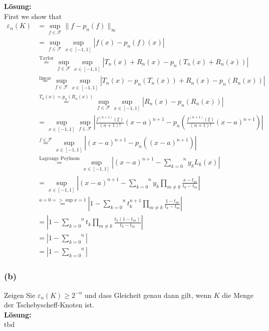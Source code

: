 \documentclass[11pt,a4paper,ngerman]{article}
\begin{document}
\textbf{Lösung:}\\
First we show that
\begin{equation*}\begin{split}
    \varepsilon_n(K)
    &= \underset{f \in \mathcal{F}}{\sup} \| f - p_n(f) \|_\infty\\
    &= \underset{f \in \mathcal{F}}{\sup}
        \underset{x \in [-1,1]}{\sup} | f (x) - p_n(f)(x) |\\
    &\stackrel{\text{Taylor}}{=} \underset{f \in \mathcal{F}}{\sup}
        \underset{x \in [-1,1]}{\sup} | T_n(x) + R_n(x) - p_n(T_n(x) + R_n(x)) |\\
    &\stackrel{\text{linear}}{=}\underset{f \in \mathcal{F}}{\sup} \underset{x \in [-1,1]}{\sup} | T_n(x) - p_n(T_n(x)) + R_n(x) - p_n(R_n(x)) |\\
    &\stackrel{T_n(x)=p_n(R_n(x))}{=} \underset{f \in \mathcal{F}}{\sup}\underset{x \in [-1,1]}{\sup} | R_n(x) - p_n(R_n(x)) | \\
    &= \underset{x \in [-1,1]}{\sup} \underset{f \in \mathcal{F}}{\sup}| \frac{f^{(n+1)}(\xi)}{(n+1)!} (x-a)^{n+1} - p_n(\frac{f^{(n+1)}(\xi)}{(n+1)!} (x-a)^{n+1}) |\\
    &\stackrel{f \in \mathcal{F}}{=} \underset{x \in [-1,1]}{\sup} | (x-a)^{n+1} - p_n((x-a)^{n+1}) |\\
    &\stackrel{\text{Lagrange Poylnom}}{=}
        \underset{x \in [-1,1]}{\sup}
    \left| (x-a)^{n+1} - \overset{n}{\underset{k=0}{\sum}} y_k L_k(x) \right|\\     
    &= \underset{x \in [-1,1]}{\sup}
     \left| (x-a)^{n+1} - 
    \overset{n}{\underset{k=0}{\sum}} y_k \underset{m \not= k}{\prod}
    \frac{x - t_m}{t_k - t_m} \right|\\
    &\stackrel{a = 0 => \sup x=1}{=}
        \left| 1 - \overset{n}{\underset{k=0}{\sum}} t_k^{n+1}
        \underset{m \not= k}{\prod} \frac{1 - t_m}{t_k - t_m} \right| \\
    &= \left| 1 - \overset{n}{\underset{k=0}{\sum}} t_k
        \underset{m \not= k}{\prod} \frac{t_k(1-t_m)}{t_k - t_m} \right| \\
    &= \left| 1 - \overset{n}{\underset{k=0}{\sum}} 
         \right|\\
    &= \left| 1 - \overset{n}{\underset{k=0}{\sum}}  \right|
\end{split}\end{equation*}

\subsubsection*{(b)}

Zeigen Sie $\varepsilon_n(K) \geq 2^{-n}$ und dass Gleicheit genau dann gilt, wenn $K$ die Menge
der Tschebyscheff-Knoten ist.\\

\textbf{Lösung:}\\

tbd


\label{LastPage}
\end{document}
